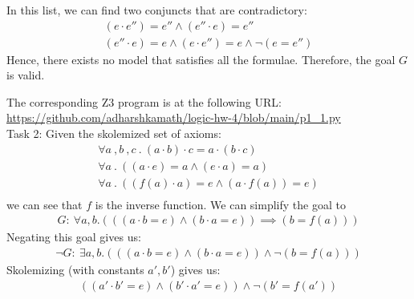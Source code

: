 \documentclass[12pt,letterpaper, onecolumn]{exam}
\newcommand{\link}[1]{{\color{blue}\href{#1}{#1}}}
\begin{document}
\begin{questions}
	In this list,
	we can find two conjuncts that are contradictory:
	\begin{align*}
		(e \cdot e'') = e'' \land (e'' \cdot e) = e'' \\
		(e'' \cdot e) = e \land (e \cdot e'') = e \land \neg (e = e'')
	\end{align*}
	Hence, there exists no model that satisfies all the formulae.
	Therefore, the goal $G$ is valid.

	The corresponding Z3 program is at the following URL:
	\link{https://github.com/adharshkamath/logic-hw-4/blob/main/p1\_1.py} \\
	

	Task 2:
	Given the skolemized set of axioms:
	\begin{align*}
		\forall a \:, b \:, c \:.\: (a \cdot b) \cdot c = a \cdot (b \cdot c) \\
		\forall a \:.\: ((a \cdot e) = a \land (e \cdot a) = a) \\
		\forall a \:.\: ((f(a)\cdot a) = e \land (a \cdot f(a)) = e) \\
	\end{align*}
	we can see that $f$ is the inverse function. We can simplify the goal to 
	\begin{align*}
		G : \: \forall a, b . (((a \cdot b = e) \land (b \cdot a = e)) \implies (b = f(a)) )
	\end{align*}
	Negating this goal gives us:
	\begin{align*}
		\neg G : \: \exists a, b . (((a \cdot b = e) \land (b \cdot a = e)) \land \neg(b = f(a)))
	\end{align*}
	Skolemizing (with constants $a', b'$) gives us:
	\begin{align*}
		((a' \cdot b' = e) \land (b' \cdot a' = e)) \land \neg(b' = f(a'))
	\end{align*}


\end{questions}
\end{document}
